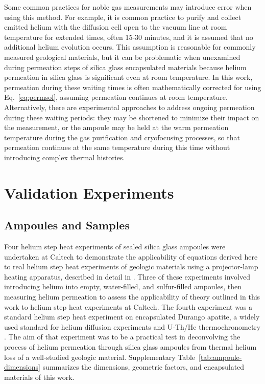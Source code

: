 Some common practices for noble gas measurements may introduce error when using this method. For example, it is common practice to purify and collect emitted helium with the diffusion cell open to the vacuum line at room temperature for extended times, often 15-30 minutes, and it is assumed that no additional helium evolution occurs. This assumption is reasonable for commonly measured geological materials, but it can be problematic when unexamined during permeation steps of silica glass encapsulated materials because helium permeation in silica glass is significant even at room temperature. In this work, permeation during these waiting times is often mathematically corrected for using Eq.~\eqref{eq:permsol}, assuming permeation continues at room temperature. Alternatively, there are experimental approaches to address ongoing permeation during these waiting periods: they may be shortened to minimize their impact on the measurement, or the ampoule may be held at the warm permeation temperature during the gas purification and cryofocusing processes, so that permeation continues at the same temperature during this time without introducing complex thermal histories.

\section{Validation Experiments}\label{experimental-methods}

\subsection{Ampoules and Samples}\label{sec:ampoules-samples}

Four helium step heat experiments of sealed silica glass ampoules were undertaken at Caltech to 
demonstrate the applicability of equations derived here to real helium step heat experiments of 
geologic materials using a projector-lamp heating apparatus, described in detail in \citet{farley1999}. 
Three of these experiments involved introducing helium into empty, water-filled, and sulfur-filled 
ampoules, then measuring helium permeation to assess the applicability of theory outlined in this work 
to helium step heat experiments at Caltech. The fourth experiment was a standard helium step heat 
experiment on encapsulated Durango apatite, a widely used standard for helium diffusion experiments 
and U-Th/He thermochronometry \citep{zeitler1987,wolf1996,farley2000,shusterfarley2004,shuster2006,flowers2007}.
The aim of that experiment was to be a practical test in deconvolving the process of helium permeation 
through silica glass ampoules from thermal helium loss of a well-studied geologic material. 
Supplementary Table~\ref{tab:ampoule-dimensions} summarizes the dimensions, geometric factors, and encapsulated 
materials of this work.

